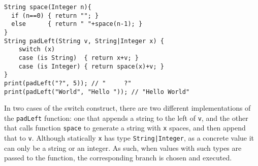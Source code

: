 \begin{lstlisting}
String space(Integer n){
  if (n==0) { return ""; }
  else      { return " "+space(n-1); }
}
String padLeft(String v, String|Integer x) {
	switch (x)
	case (is String)  { return x+v; }
	case (is Integer) { return space(x)+v; }
}
print(padLeft("?", 5)); // "     ?"
print(padLeft("World", "Hello ")); // "Hello World"
\end{lstlisting}
%

\noindent In two cases of the switch construct, there are two different implementations
of the \lstinline{padLeft} function: one that appends a string to the left of \lstinline{v},
and the other that calls function \lstinline{space} to generate a string with \lstinline{x} spaces,
and then append that to \lstinline{v}.
Although statically \lstinline{x} has type \lstinline{String|Integer}, as a concrete value
it can only be a string or an integer.
As such, when values with such types are passed to the function,
the corresponding branch is chosen and executed.

